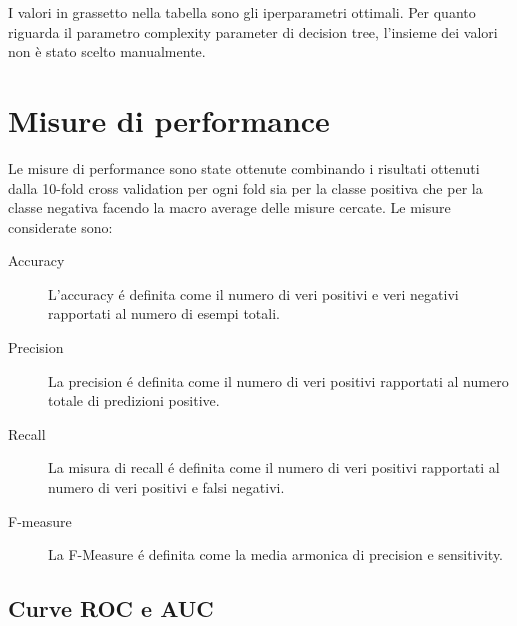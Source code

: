 I valori in grassetto nella tabella sono gli iperparametri ottimali.
Per quanto riguarda il parametro complexity parameter di decision
tree, l'insieme dei valori non è stato scelto manualmente.


\section{Misure di performance}
Le misure di performance sono state ottenute combinando i risultati
ottenuti dalla 10-fold cross validation per ogni fold sia per la
classe positiva che per la classe negativa facendo la macro average
delle misure cercate. Le misure considerate sono:

\begin{description}
\item [Accuracy] L'accuracy é definita come il numero di veri positivi
  e veri negativi rapportati al numero di esempi totali.

\item [Precision] La precision é definita come il numero di veri
  positivi rapportati al numero totale di predizioni positive.

\item [Recall] La misura di recall é definita come il numero di veri
  positivi rapportati al numero di veri positivi e falsi negativi.

\item [F-measure] La F-Measure é definita come la media armonica di
  precision e sensitivity.
\end{description}

\subsection{Curve ROC e AUC}

